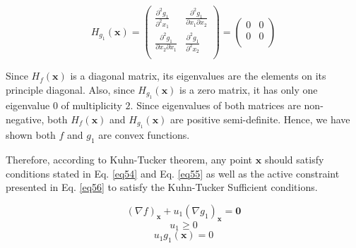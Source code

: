 \begin{equation}
H_{g_1}(\mathbf{x})
= \begin{pmatrix}
\frac{\partial^2 g_1}{\partial^2 x_1} & \frac{\partial^2 g_1}{\partial x_1 \partial x_2}\\[0.6em]
\frac{\partial^2 g_1}{\partial x_2 \partial x_1} & \frac{\partial^2 g_1}{\partial^2 x_2}\\
\end{pmatrix}
= \begin{pmatrix}
0 & 0\\[0.6em]
0 & 0\\
\end{pmatrix}
\label{eq53}
\end{equation}

Since $H_f(\mathbf{x})$ is a diagonal matrix, its eigenvalues are the elements on its principle diagonal.
Also, since $H_{g_1}(\mathbf{x})$ is a zero matrix, it has only one eigenvalue $0$ of multiplicity $2$.
Since eigenvalues of both matrices are non-negative, both $H_f(\mathbf{x})$ and $H_{g_1}(\mathbf{x})$ are positive semi-definite.
Hence, we have shown both $f$ and $g_1$ are convex functions.

Therefore, according to Kuhn-Tucker theorem, any point $\mathbf{x}$ should satisfy conditions stated in Eq. \ref{eq54} and Eq. \ref{eq55} as well as the active constraint presented in Eq. \ref{eq56} to satisfy the Kuhn-Tucker Sufficient conditions.

\begin{equation}
(\nabla f)_\mathbf{x} + u_1 (\nabla g_1)_\mathbf{x} = \mathbf{0}
\label{eq54}
\end{equation}
\begin{equation}
u_1 \geq 0
\label{eq55}
\end{equation}
\begin{equation}
u_1 g_1(\mathbf{x}) = 0
\label{eq56}
\end{equation}

